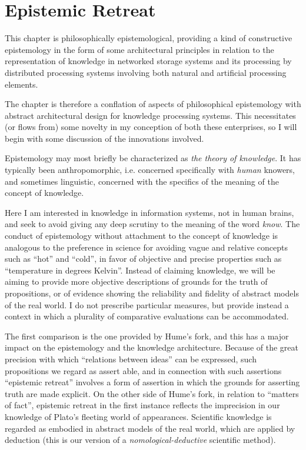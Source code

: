 
\chapter{Epistemic Retreat}\label{EpistemicRetreat}

This chapter is philosophically epistemological, providing a kind of
constructive epistemology in the form of some architectural principles
in relation to the representation of knowledge in networked storage
systems and its processing by distributed processing systems involving
both natural and artificial processing elements. 

The chapter is therefore a conflation of aspects of philosophical
epistemology with abstract architectural design for knowledge
processing systems. 
This necessitates (or flows from) some novelty in my conception of
both these enterprises, so I will begin with some discussion of the
innovations involved. 

Epistemology may most briefly be characterized as \emph{the theory of
  knowledge}. 
It has typically been anthropomorphic, i.e. concerned specifically
with \emph{human} knowers, and sometimes linguistic, concerned with
the specifics of the meaning of the concept of knowledge. 

Here I am interested in knowledge in information systems, not in human
brains, and seek to avoid giving any deep scrutiny to the meaning of
the word \emph{know}.
The conduct of epistemology without attachment to the concept of
knowledge is analogous to the preference in science for avoiding vague and
relative concepts such as ``hot'' and ``cold'', in favor of objective
and precise properties such as ``temperature in degrees Kelvin''.
Instead of claiming knowledge, we will be aiming to provide more
objective descriptions of grounds for the truth of
propositions, or of evidence showing the reliability and fidelity of
abstract models of the real world.
I do not prescribe particular measures, but provide instead a context
in which a plurality of comparative evaluations can be accommodated.

The first comparison is the one provided by Hume's fork, and this has
a major impact on the epistemology and the knowledge architecture.
Because of the great precision with which ``relations between ideas''
can be expressed, such propositions we regard as assert able, and in
connection with such assertions ``epistemic retreat'' involves a form
of assertion in which the grounds for asserting truth are made
explicit.
On the other side of Hume's fork, in relation to ``matters of fact'',
epistemic retreat in the first instance reflects the imprecision in
our knowledge of Plato's fleeting world of appearances.
Scientific knowledge is regarded as embodied in abstract models of the
real world, which are applied by deduction (this is our version of a
\emph{nomological-deductive} scientific method).

